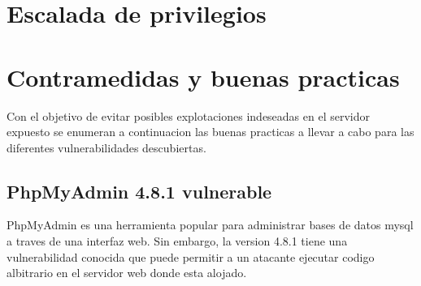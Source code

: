\documentclass[a4paper]{article} %
\begin{document}
  \section{Escalada de privilegios}
  \section{Contramedidas y buenas practicas}
  Con el objetivo de evitar posibles explotaciones indeseadas en el servidor expuesto se enumeran a continuacion las buenas practicas a llevar a cabo para las diferentes vulnerabilidades descubiertas.
  \subsection{PhpMyAdmin 4.8.1 vulnerable}
  PhpMyAdmin es una herramienta popular para administrar bases de datos mysql a traves de una interfaz web. Sin embargo, la version 4.8.1 tiene una vulnerabilidad conocida que puede permitir a un atacante ejecutar codigo albitrario en el servidor web donde esta alojado.
\end{document}
